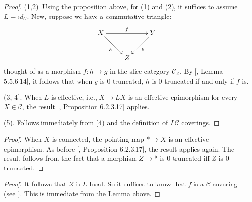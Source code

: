 \begin{proof}
(1,2). Using the proposition above, for (1) and (2), it suffices to assume $L=id_\mathcal{C}$. Now, suppose we have a commutative triangle:
\[
\xymatrix{
X\ar[rr]^f\ar[dr]_h&&Y\ar[dl]^g\\
&Z&
}
\]
thought of as a morphism $f: h\to g$ in the slice category $\mathcal{C}_{Z}$. By [\cite{lurie2009higher}, Lemma 5.5.6.14], it follows that when $g$ is $0$-truncated, $h$ is $0$-truncated if and only if $f$ is. 

(3, 4).
When $L$ is effective, i.e., $X\to LX$ is an effective epimorphism for every $X\in \mathcal{C}$, the result [\cite{lurie2009higher}, Proposition 6.2.3.17] applies.

(5). Follows immediately from (4) and the definition of $L\mathcal{C}$ coverings.
\end{proof}
\begin{proof}
    When $X$ is connected, the pointing map $*\to X$ is an effective epimorphism. As before [\cite{lurie2009higher}, Proposition 6.2.3.17], the result applies again. The result follows from the fact that a morphism $Z\to *$ is $0$-truncated iff $Z$ is $0$-truncated.
\end{proof}
\begin{proof}
    It follows that $Z$ is $L$-local. So it suffices to know that $f$ is a $\mathcal{C}$-covering (see ). This is immediate from the Lemma above. 
\end{proof}
